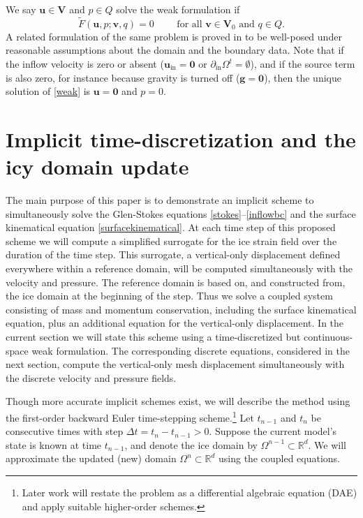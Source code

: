 \documentclass[letterpaper,final,12pt,reqno]{amsart}
\newcommand{\RR}{\mathbb{R}}
\newcommand{\bg}{\mathbf{g}}
\newcommand{\bu}{\mathbf{u}}
\newcommand{\bv}{\mathbf{v}}
\newcommand{\bV}{\mathbf{V}}
\newcommand{\bzero}{\bm{0}}
\begin{document}
We say $\bu\in \bV$ and $p\in Q$ solve the weak formulation if
\begin{equation}
\tilde F(\bu,p;\bv,q) = 0 \qquad \text{ for all } \bv\in \bV_0 \text{ and } q\in Q.  \label{weak}
\end{equation}
A related formulation of the same problem is proved in \cite[Theorem 3.8]{JouvetRappaz2011} to be well-posed under reasonable assumptions about the domain and the boundary data.  Note that if the inflow velocity is zero or absent ($\bu_{\text{in}}=\bzero$ or $\partial_{\text{in}} \Omega^t = \emptyset$), and if the source term is also zero, for instance because gravity is turned off ($\bg=\bzero$), then the unique solution of \eqref{weak} is $\bu=\bzero$ and $p=0$.


\section{Implicit time-discretization and the icy domain update} \label{sec:implicitstep}

The main purpose of this paper is to demonstrate an implicit scheme to simultaneously solve the Glen-Stokes equations \eqref{stokes}--\eqref{inflowbc} and the surface kinematical equation \eqref{surfacekinematical}.  At each time step of this proposed scheme we will compute a simplified surrogate for the ice strain field over the duration of the time step.  This surrogate, a vertical-only displacement defined everywhere within a reference domain, will be computed simultaneously with the velocity and pressure.  The reference domain is based on, and constructed from, the ice domain at the beginning of the step.  Thus we solve a coupled system consisting of mass and momentum conservation, including the surface kinematical equation, plus an additional equation for the vertical-only displacement.  In the current section we will state this scheme using a time-discretized but continuous-space weak formulation.  The corresponding discrete equations, considered in the next section, compute the vertical-only mesh displacement simultaneously with the discrete velocity and pressure fields.

Though more accurate implicit schemes exist, we will describe the method using the first-order backward Euler time-stepping scheme.\footnote{Later work will restate the problem as a differential algebraic equation (DAE) and apply suitable higher-order schemes.}
Let $t_{n-1}$ and $t_n$ be consecutive times with step $\Delta t = t_n - t_{n-1} > 0$.  Suppose the current model's state is known at time $t_{n-1}$, and denote the ice domain by $\Omega^{n-1} \subset \RR^d$.  We will approximate the updated (new) domain $\Omega^n \subset \RR^d$ using the coupled equations.
\end{document}
